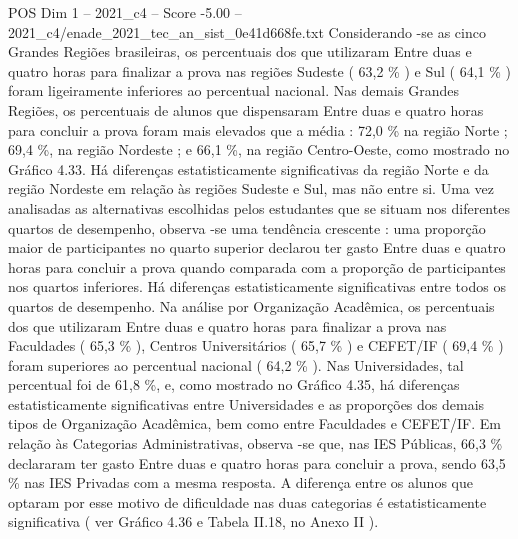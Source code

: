 \begin{textsample}{POS Dim 1 – 2021\_c4 – Score -5.00 – 2021\_c4/enade\_2021\_tec\_an\_sist\_0e41d668fe.txt}
Considerando -se as cinco Grandes Regiões brasileiras, os percentuais dos que utilizaram Entre duas e quatro horas para finalizar a prova nas regiões Sudeste ( 63,2 \% ) e Sul ( 64,1 \% ) foram ligeiramente inferiores ao percentual nacional.
Nas demais Grandes Regiões, os percentuais de alunos que dispensaram Entre duas e quatro horas para concluir a prova foram mais elevados que a média : 72,0 \% na região Norte ; 69,4 \%, na região Nordeste ; e 66,1 \%, na região Centro-Oeste, como mostrado no Gráfico 4.33.
Há diferenças estatisticamente significativas da região Norte e da região Nordeste em relação às regiões Sudeste e Sul, mas não entre si.
Uma vez analisadas as alternativas escolhidas pelos estudantes que se situam nos diferentes quartos de desempenho, observa -se uma tendência crescente : uma proporção maior de participantes no quarto superior declarou ter gasto Entre duas e quatro horas para concluir a prova quando comparada com a proporção de participantes nos quartos inferiores.
Há diferenças estatisticamente significativas entre todos os quartos de desempenho.
Na análise por Organização Acadêmica, os percentuais dos que utilizaram Entre duas e quatro horas para finalizar a prova nas Faculdades ( 65,3 \% ), Centros Universitários ( 65,7 \% ) e CEFET/IF ( 69,4 \% ) foram superiores ao percentual nacional ( 64,2 \% ).
Nas Universidades, tal percentual foi de 61,8 \%, e, como mostrado no Gráfico 4.35, há diferenças estatisticamente significativas entre Universidades e as proporções dos demais tipos de Organização Acadêmica, bem como entre Faculdades e CEFET/IF.
Em relação às Categorias Administrativas, observa -se que, nas IES Públicas, 66,3 \% declararam ter gasto Entre duas e quatro horas para concluir a prova, sendo 63,5 \% nas IES Privadas com a mesma resposta.
A diferença entre os alunos que optaram por esse motivo de dificuldade nas duas categorias é estatisticamente significativa ( ver Gráfico 4.36 e Tabela II.18, no Anexo II ).

\end{textsample}
